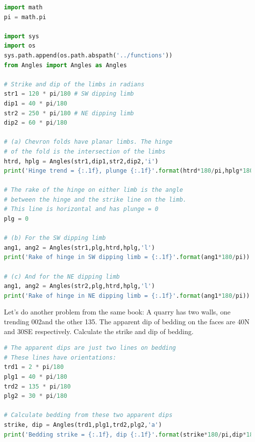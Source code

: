 \documentclass[a4paper , 12pt]{book}
\begin{document}
\begin{center}
\begin{lstlisting}[language=Python, frame=single]
import math
pi = math.pi

import sys
import os
sys.path.append(os.path.abspath('../functions'))
from Angles import Angles as Angles

# Strike and dip of the limbs in radians
str1 = 120 * pi/180 # SW dipping limb
dip1 = 40 * pi/180
str2 = 250 * pi/180 # NE dipping limb
dip2 = 60 * pi/180

# (a) Chevron folds have planar limbs. The hinge
# of the fold is the intersection of the limbs
htrd, hplg = Angles(str1,dip1,str2,dip2,'i')
print('Hinge trend = {:.1f}, plunge {:.1f}'.format(htrd*180/pi,hplg*180/pi))

# The rake of the hinge on either limb is the angle 
# between the hinge and the strike line on the limb. 
# This line is horizontal and has plunge = 0
plg = 0

# (b) For the SW dipping limb
ang1, ang2 = Angles(str1,plg,htrd,hplg,'l')
print('Rake of hinge in SW dipping limb = {:.1f}'.format(ang1*180/pi))

# (c) And for the NE dipping limb
ang1, ang2 = Angles(str2,plg,htrd,hplg,'l')
print('Rake of hinge in NE dipping limb = {:.1f}'.format(ang1*180/pi))
\end{lstlisting}
\end{center}

Let's do another problem from the same book: A quarry has two walls, one trending 002\degree and the other 135\degree. The apparent dip of bedding on the faces are 40\degree N and 30\degree SE respectively. Calculate the strike and dip of bedding.

\begin{center}
\begin{lstlisting}[language=Python, frame=single]
# The apparent dips are just two lines on bedding
# These lines have orientations:
trd1 = 2 * pi/180
plg1 = 40 * pi/180
trd2 = 135 * pi/180
plg2 = 30 * pi/180

# Calculate bedding from these two apparent dips
strike, dip = Angles(trd1,plg1,trd2,plg2,'a')
print('Bedding strike = {:.1f}, dip {:.1f}'.format(strike*180/pi,dip*180/pi))
\end{lstlisting}
\end{center}
\end{document}
